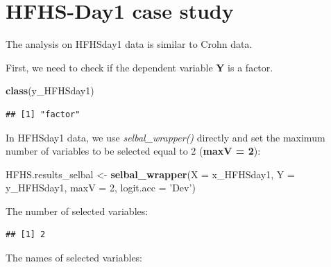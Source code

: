 \documentclass[openany]{book}
\newenvironment{Shaded}{\begin{snugshade}}{\end{snugshade}}
\newcommand{\KeywordTok}[1]{\textcolor[rgb]{0.13,0.29,0.53}{\textbf{#1}}}
\newcommand{\DataTypeTok}[1]{\textcolor[rgb]{0.13,0.29,0.53}{#1}}
\newcommand{\DecValTok}[1]{\textcolor[rgb]{0.00,0.00,0.81}{#1}}
\newcommand{\StringTok}[1]{\textcolor[rgb]{0.31,0.60,0.02}{#1}}
\newcommand{\OperatorTok}[1]{\textcolor[rgb]{0.81,0.36,0.00}{\textbf{#1}}}
\newcommand{\NormalTok}[1]{#1}
\begin{document}
\section{HFHS-Day1 case study}\label{hfhs-day1-case-study}

The analysis on HFHSday1 data is similar to Crohn data.

First, we need to check if the dependent variable \textbf{Y} is a
factor.

\begin{Shaded}
\begin{Highlighting}[]
\KeywordTok{class}\NormalTok{(y_HFHSday1)}
\end{Highlighting}
\end{Shaded}

\begin{verbatim}
## [1] "factor"
\end{verbatim}

In HFHSday1 data, we use \emph{selbal\_wrapper()} directly and set the
maximum number of variables to be selected equal to 2 (\textbf{maxV =
2}):

\begin{Shaded}
\begin{Highlighting}[]
\NormalTok{HFHS.results_selbal <-}\StringTok{ }\KeywordTok{selbal_wrapper}\NormalTok{(}\DataTypeTok{X =}\NormalTok{ x_HFHSday1, }\DataTypeTok{Y =}\NormalTok{ y_HFHSday1, }
                                      \DataTypeTok{maxV =} \DecValTok{2}\NormalTok{, }\DataTypeTok{logit.acc =} \StringTok{'Dev'}\NormalTok{) }
\end{Highlighting}
\end{Shaded}

The number of selected variables:

\begin{Shaded}
\end{Shaded}

\begin{verbatim}
## [1] 2
\end{verbatim}

The names of selected variables:

\begin{Shaded}
\end{Shaded}
\end{document}
